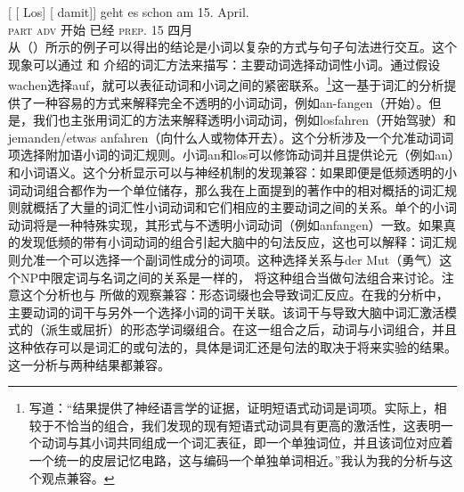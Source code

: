 \begin{exe}
\begin{xlist}[iv.]
\begin{exe}
\begin{xlist}[iv.]
\ex
\gll {}[ [ Los]        [ damit]]    geht es schon   am 15. April.\footnotemark\\
       {}        {}        \textsc{part}  {}        \textsc{adv} 开始 \expl{} 已经 \textsc{prep}. 15 四月\\%
%
\zl
从（）所示的例子可以得出的结论是小词以复杂的方式与句子句法进行交互。这个现象可以通过 和 介绍的词汇方法来描写：主要动词选择动词性小词。通过假设wachen选择auf，就可以表征动词和小词之间的紧密联系。\footnote{%
   \citet[]{CSP2010a}写道：“结果提供了神经语言学的证据，证明短语式动词是词项。实际上，相较于不恰当的组合，我们发现的现有短语式动词具有更高的激活性，这表明一个动词与其小词共同组成一个词汇表征，即一个单独词位，并且该词位对应着一个统一的皮层记忆电路，这与编码一个单独单词相近。”我认为我的分析与这个观点兼容。
}这一基于词汇的分析提供了一种容易的方式来解释完全不透明的小词动词，例如an-fangen（开始）。但是，我们也主张用词汇的方法来解释透明小词动词，例如losfahren（开始驾驶）和jemanden/etwas anfahren（向什么人或物体开去）。这个分析涉及一个允准动词词项选择附加语小词的词汇规则。小词an和los可以修饰动词并且提供论元（例如an）和小词语义。这个分析显示可以与神经机制的发现兼容：如果即便是低频透明的小词动词组合都作为一个单位储存，那么我在上面提到的著作中的相对概括的词汇规则就概括了大量的词汇性小词动词和它们相应的主要动词之间的关系。单个的小词动词将是一种特殊实现，其形式与不透明小词动词（例如anfangen）一致。如果真的发现低频的带有小词动词的组合引起大脑中的句法反应，这也可以解释：词汇规则允准一个可以选择一个副词性成分的词项。这种选择关系与der Mut（勇气）这个NP中限定词与名词之间的关系是一样的， \citet[]{CSP2010a}将这种组合当做句法组合来讨论。注意这个分析也与 \citet*{SPP2005a-u}所做的观察兼容：形态词缀也会导致词汇反应。在我的分析中，主要动词的词干与另外一个选择小词的词干关联。该词干与导致大脑中词汇激活模式的（派生或屈折）的形态学词缀组合。在这一组合之后，动词与小词组合，并且这种依存可以是词汇的或句法的，具体是词汇还是句法的取决于将来实验的结果。这一分析与两种结果都兼容。

\end{xlist}
\end{exe}
\end{xlist}
\end{exe}
